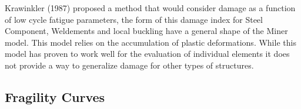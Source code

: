 Krawinkler (1987) \cite{Krawinkler1987} proposed a method that would consider damage as a function of low cycle fatigue parameters, the form of this damage index for Steel Component, Weldements and local buckling have a general shape of the Miner model. This model relies on the accumulation of plastic deformations. While this model has proven to work well for the evaluation of individual elements it does not provide a way to generalize damage for other types of structures.

\subsection{Fragility Curves}

